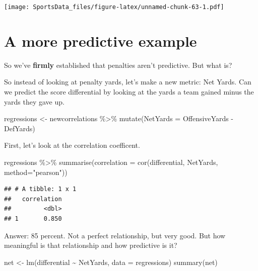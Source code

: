 \documentclass[
]{book}
\newenvironment{Shaded}{\begin{snugshade}}{\end{snugshade}}
\newcommand{\AttributeTok}[1]{\textcolor[rgb]{0.77,0.63,0.00}{#1}}
\newcommand{\FunctionTok}[1]{\textcolor[rgb]{0.00,0.00,0.00}{#1}}
\newcommand{\NormalTok}[1]{#1}
\newcommand{\OtherTok}[1]{\textcolor[rgb]{0.56,0.35,0.01}{#1}}
\newcommand{\SpecialCharTok}[1]{\textcolor[rgb]{0.00,0.00,0.00}{#1}}
\newcommand{\StringTok}[1]{\textcolor[rgb]{0.31,0.60,0.02}{#1}}
\begin{document}
\texttt{[image: SportsData\_files/figure-latex/unnamed-chunk-63-1.pdf]}

\hypertarget{a-more-predictive-example}{%
\section{A more predictive example}\label{a-more-predictive-example}}

So we've \textbf{firmly} established that penalties aren't predictive. But what is?

So instead of looking at penalty yards, let's make a new metric: Net Yards. Can we predict the score differential by looking at the yards a team gained minus the yards they gave up.

\begin{Shaded}
\begin{Highlighting}[]
\NormalTok{regressions }\OtherTok{\textless{}{-}}\NormalTok{ newcorrelations }\SpecialCharTok{\%\textgreater{}\%} \FunctionTok{mutate}\NormalTok{(}\AttributeTok{NetYards =}\NormalTok{ OffensiveYards }\SpecialCharTok{{-}}\NormalTok{ DefYards)}
\end{Highlighting}
\end{Shaded}

First, let's look at the correlation coefficent.

\begin{Shaded}
\begin{Highlighting}[]
\NormalTok{regressions }\SpecialCharTok{\%\textgreater{}\%} 
  \FunctionTok{summarise}\NormalTok{(}\AttributeTok{correlation =} \FunctionTok{cor}\NormalTok{(differential, NetYards, }\AttributeTok{method=}\StringTok{"pearson"}\NormalTok{))}
\end{Highlighting}
\end{Shaded}

\begin{verbatim}
## # A tibble: 1 x 1
##   correlation
##         <dbl>
## 1       0.850
\end{verbatim}

Answer: 85 percent. Not a perfect relationship, but very good. But how meaningful is that relationship and how predictive is it?

\begin{Shaded}
\begin{Highlighting}[]
\NormalTok{net }\OtherTok{\textless{}{-}} \FunctionTok{lm}\NormalTok{(differential }\SpecialCharTok{\textasciitilde{}}\NormalTok{ NetYards, }\AttributeTok{data =}\NormalTok{ regressions)}
\FunctionTok{summary}\NormalTok{(net)}
\end{Highlighting}
\end{Shaded}
\end{document}
